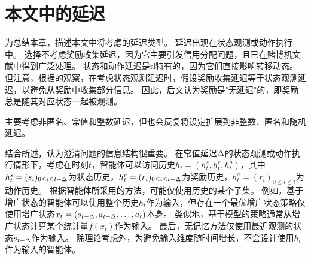 
\section{本文中的延迟}
\label{subsec:delay_in_this_thesis}

为总结本章，描述本文中将考虑的延迟类型。
延迟出现在状态观测或动作执行中。
选择不考虑奖励收集延迟，因为它主要引发信用分配问题，且已在赌博机文献中得到广泛处理。
状态和动作延迟是\gls{rl}特有的，因为它们直接影响转移动态。
但注意，根据的观察，在考虑状态观测延迟时，假设奖励收集延迟等于状态观测延迟，以避免从奖励中收集部分信息。
因此，后文认为奖励是"无延迟"的，即奖励总是随其对应状态一起被观测。

主要考虑非匿名、常值和整数延迟，但也会反复将设定扩展到非整数、匿名和随机延迟。

结合所述，认为澄清问题的信息结构很重要。
在常值延迟$\Delta$的状态观测或动作执行情形下，考虑在时刻$t$，智能体可以访问历史$h_t = (h^s_t,h^r_t,h^a_t)$，其中$h^s_t = (s_i)_{0\le i\le t-\Delta}$为状态历史，$h^r_t = (r_i)_{0\le i\le t-\Delta}$为奖励历史，$h^a_t = (r_i)_{0\le i\le t}$为动作历史。
根据智能体所采用的方法，可能仅使用历史的某个子集。
例如，基于增广状态的智能体可以使用整个历史$h_t$作为输入，但存在一个最优增广状态策略仅使用增广状态$x_t=(s_{t-\Delta},a_{t-\Delta},\dots,a_t)$本身。
类似地，基于模型的策略通常从增广状态计算某个统计量$f(x_t)$作为输入。
最后，无记忆方法仅使用最近观测的状态$s_{t-\Delta}$作为输入。
除理论考虑外，为避免输入维度随时间增长，不会设计使用$h_t$作为输入的智能体。